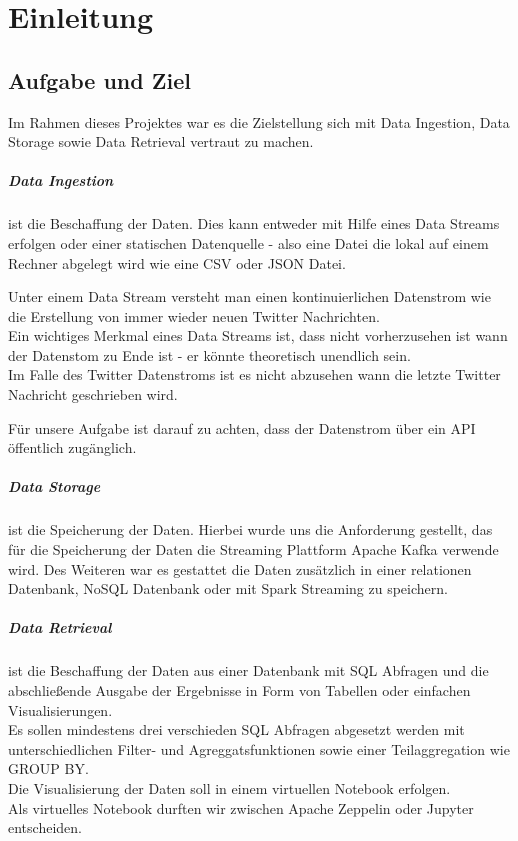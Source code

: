 \chapter{Einleitung}
\label{chap:einleitung}

\section{Aufgabe und Ziel}
Im Rahmen dieses Projektes war es die Zielstellung sich mit Data Ingestion, Data Storage sowie Data Retrieval vertraut zu machen.
\paragraph{Data Ingestion} ist die Beschaffung der Daten.
Dies kann entweder mit Hilfe eines Data Streams erfolgen oder einer statischen Datenquelle - also eine Datei die lokal
auf einem Rechner abgelegt wird wie \zb{} eine \ac{CSV} oder \ac{JSON} Datei.

Unter einem Data Stream versteht man einen kontinuierlichen Datenstrom wie \zb{}
die Erstellung von immer wieder neuen Twitter Nachrichten.\\
Ein wichtiges Merkmal eines Data Streams ist, dass nicht vorherzusehen ist wann der Datenstom zu Ende ist - er könnte theoretisch unendlich sein.
\\
Im Falle des Twitter Datenstroms ist es nicht abzusehen wann die letzte Twitter Nachricht geschrieben wird.

Für unsere Aufgabe ist darauf zu achten, dass der Datenstrom über ein \ac{API} öffentlich zugänglich.

\paragraph{Data Storage} ist die Speicherung der Daten.
Hierbei wurde uns die Anforderung gestellt, das für die Speicherung der Daten die Streaming Plattform Apache Kafka verwende wird.
Des Weiteren war es gestattet die Daten zusätzlich in einer relationen Datenbank, NoSQL Datenbank oder mit Spark Streaming zu speichern.

\paragraph{Data Retrieval} ist die Beschaffung der Daten aus einer Datenbank mit \ac{SQL} Abfragen und die abschließende Ausgabe
der Ergebnisse in Form von Tabellen oder einfachen Visualisierungen. \\
Es sollen mindestens drei verschieden \ac{SQL} Abfragen abgesetzt werden mit unterschiedlichen Filter- und Agreggatsfunktionen sowie einer Teilaggregation wie \zb{} GROUP BY.
\\
Die Visualisierung der Daten soll in einem virtuellen Notebook erfolgen.
\\
Als virtuelles Notebook durften wir zwischen Apache Zeppelin oder Jupyter entscheiden.

